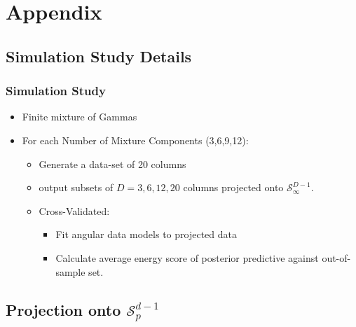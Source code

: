 \documentclass[aspectratio=169,10pt]{beamer}
\begin{document}
\appendix

\section*{Appendix}

\subsection*{Simulation Study Details}

\begin{frame}
    \label{pgpareto:simstudydetails}
    \frametitle{Simulation Study}
    \begin{itemize}
        \item Finite mixture of Gammas
        \item For each Number of Mixture Components (3,6,9,12):
            \begin{itemize}
                \item Generate a data-set of 20 columns
                \item output subsets of $D = 3,6,12,20$ columns projected 
                    onto $\mathcal{S}_{\infty}^{D-1}$.
                \item Cross-Validated:
                    \begin{itemize}
                        \item Fit angular data models to projected data
                        \item Calculate average energy score of posterior 
                            predictive against out-of-sample set.
                    \end{itemize}
            \end{itemize}
    \end{itemize}
    \hyperlink{pgpareto:simstudy}{}
\end{frame} %

\subsection*{Projection onto $\mathcal{S}_p^{d-1}$}
\end{document}
